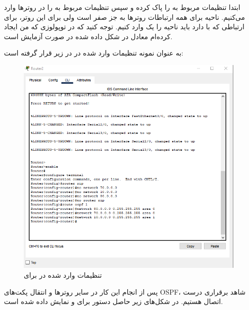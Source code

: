 \documentclass[12pt]{article}
\begin{document}
ابتدا تنظیمات مربوط به  را پاک کرده و سپس تنظیمات مربوط به  را در روتر‌ها وارد می‌کنیم. ناحیه برای همه  ارتباطات روترها به جز  صفر است ولی برای این روتر، برای ارتباطی که با  دارد باید ناحیه را یک وارد کنیم.  توجه کنید که  در توپولوزی‌ که من ایجاد کرده‌ام معادل  در شکل داده شده در صورت آزمایش است.

به عنوان نمونه تنظیمات وارد شده در  در زیر قرار گرفته است:

\begin{figure}[H]
	\centering
	\includegraphics[scale=0.4]{images/ospf/15.png}
	\caption{تنظیمات وارد شده در  برای } 
	\label{riptracert}
\end{figure}

پس از انجام این کار در سایر روترها و انتقال پکت‌های OSPF، شاهد برقراری درست اتصال هستیم. در شکل‌های زیر حاصل دستور
برای 
و
نمایش داده شده است.
\end{document}
